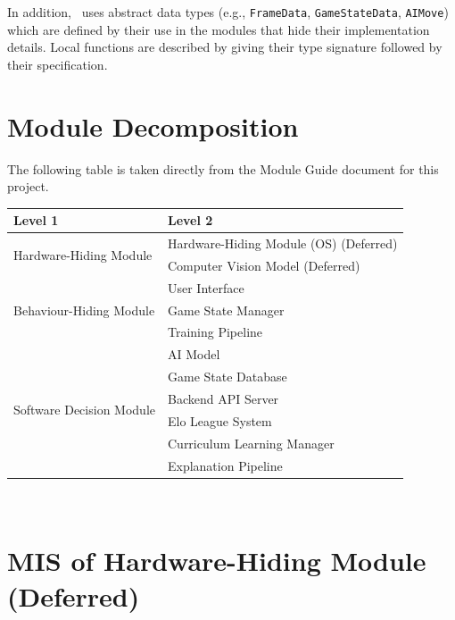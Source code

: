 \documentclass[12pt, titlepage]{article}
\begin{document}
\noindent
In addition, \progname \ uses abstract
 data types (e.g., \texttt{FrameData}, 
 \texttt{GameStateData}, \texttt{AIMove})
  which are defined by their use in the 
  modules that hide their implementation 
  details. Local functions are described by
   giving their type signature followed by
    their specification.

\section{Module Decomposition}

The following table is taken directly from the Module Guide document for this project.

\begin{table}[h!]
\centering
\begin{tabular}{p{} p{}}
\toprule
\textbf{Level 1} & \textbf{Level 2}\\
\midrule

\multirow{2}{0.3\textwidth}{Hardware-Hiding Module}
& Hardware-Hiding Module (OS) (Deferred) \\
& Computer Vision Model (Deferred) \\
\midrule

\multirow{3}{0.3\textwidth}{Behaviour-Hiding Module}
& User Interface \\
& Game State Manager \\
& Training Pipeline \\
\midrule

\multirow{6}{0.3\textwidth}{Software Decision Module}
& AI Model \\
& Game State Database \\
& Backend API Server \\
& Elo League System \\
& Curriculum Learning Manager \\
& Explanation Pipeline \\
\bottomrule

\end{tabular}
\end{table}

\newpage
~\newpage


\section{MIS of Hardware-Hiding Module (Deferred)} \label{M1}
\end{document}
